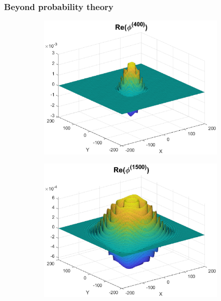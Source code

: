 \documentclass{beamer}
\theoremstyle{definition}
\begin{document}
\begin{frame}
\frametitle{Beyond probability theory}


\begin{figure}[!htb]
\begin{subfigure}{0.495\textwidth}
	\centering
	\includegraphics[width=\textwidth]{Real_400.eps}
\end{subfigure}
\begin{subfigure}{0.495\textwidth}
	\centering
	\includegraphics[width=\textwidth]{Real_1500.eps}
\end{subfigure}
\end{figure}


\end{frame}
\end{document}
